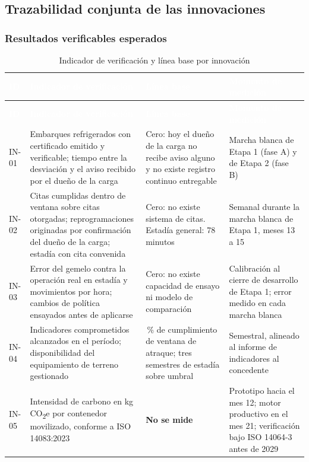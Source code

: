 \subsection{Trazabilidad conjunta de las innovaciones}

\subsubsection{Resultados verificables esperados}

\begin{longtable}{@{}>{\raggedright\arraybackslash}p{1.3cm}>{\raggedright\arraybackslash}p{4.4cm}>{\raggedright\arraybackslash}p{3.6cm}>{\raggedright\arraybackslash}p{6.1cm}@{}}
\caption{Indicador de verificación y línea base por
innovación}\label{tab:indicadores}\\
\toprule
\rowcolor{terabyteFondo}
\textcolor{white}{\bfseries ID} &
\textcolor{white}{\bfseries Indicador de verificación} &
\textcolor{white}{\bfseries Línea base} &
\textcolor{white}{\bfseries Momento de medición} \\
\midrule
\endfirsthead
\toprule
\rowcolor{terabyteFondo}
\textcolor{white}{\bfseries ID} &
\textcolor{white}{\bfseries Indicador de verificación} &
\textcolor{white}{\bfseries Línea base} &
\textcolor{white}{\bfseries Momento de medición} \\
\midrule
\endhead
\bottomrule
\endfoot
IN-01 &
Embarques refrigerados con certificado emitido y verificable; tiempo entre la
desviación y el aviso recibido por el dueño de la carga &
Cero: hoy el dueño de la carga no recibe aviso alguno y no existe registro
continuo entregable &
Marcha blanca de Etapa 1 (fase A) y de Etapa 2 (fase B) \\
\addlinespace
IN-02 &
Citas cumplidas dentro de ventana sobre citas otorgadas; reprogramaciones
originadas por confirmación del dueño de la carga; estadía con cita convenida &
Cero: no existe sistema de citas. Estadía general: 78 minutos &
Semanal durante la marcha blanca de Etapa 1, meses 13 a 15 \\
\addlinespace
IN-03 &
Error del gemelo contra la operación real en estadía y movimientos por hora;
cambios de política ensayados antes de aplicarse &
Cero: no existe capacidad de ensayo ni modelo de comparación &
Calibración al cierre de desarrollo de Etapa 1; error medido en cada marcha
blanca \\
\addlinespace
IN-04 &
Indicadores comprometidos alcanzados en el período; disponibilidad del
equipamiento de terreno gestionado &
71\,\% de cumplimiento de ventana de atraque; tres semestres de estadía sobre
umbral &
Semestral, alineado al informe de indicadores al concedente \\
\addlinespace
IN-05 &
Intensidad de carbono en kg CO\textsubscript{2}e por contenedor movilizado,
conforme a ISO 14083:2023 &
\textbf{No se mide} &
Prototipo hacia el mes 12; motor productivo en el mes 21; verificación bajo
ISO 14064-3 antes de 2029 \\
\end{longtable}

